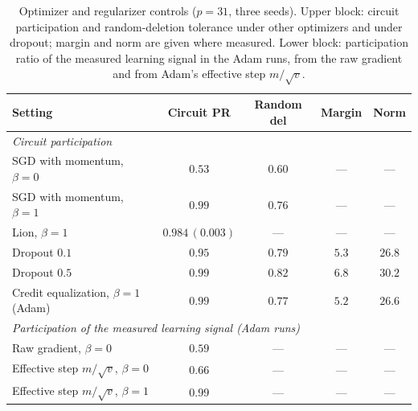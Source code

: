 \documentclass{article} %
\begin{document}
\begin{table}[!ht]
\caption{Optimizer and regularizer controls ($p=31$, three seeds). Upper block: circuit participation and random-deletion tolerance under other optimizers and under dropout; margin and norm are given where measured. Lower block: participation ratio of the measured learning signal in the Adam runs, from the raw gradient and from Adam's effective step $m/\sqrt{v}$.}
\label{tab:baselines}
\begin{center}
\small
\begin{tabular}{lcccc}
\toprule
Setting & Circuit PR & Random del & Margin & Norm \\
\midrule
\multicolumn{5}{l}{\emph{Circuit participation}} \\
SGD with momentum, $\beta{=}0$ & $0.53$ & $0.60$ & --- & --- \\
SGD with momentum, $\beta{=}1$ & $0.99$ & $0.76$ & --- & --- \\
Lion, $\beta{=}1$ & $0.984\,(0.003)$ & --- & --- & --- \\
Dropout $0.1$ & $0.95$ & $0.79$ & $5.3$ & $26.8$ \\
Dropout $0.5$ & $0.99$ & $0.82$ & $6.8$ & $30.2$ \\
Credit equalization, $\beta{=}1$ (Adam) & $0.99$ & $0.77$ & $5.2$ & $26.6$ \\
\midrule
\multicolumn{5}{l}{\emph{Participation of the measured learning signal (Adam runs)}} \\
Raw gradient, $\beta{=}0$ & $0.59$ & --- & --- & --- \\
Effective step $m/\sqrt{v}$, $\beta{=}0$ & $0.66$ & --- & --- & --- \\
Effective step $m/\sqrt{v}$, $\beta{=}1$ & $0.99$ & --- & --- & --- \\
\bottomrule
\end{tabular}
\end{center}
\end{table}
\end{document}
